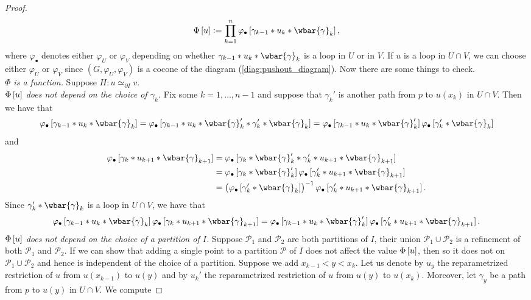 \begin{proof}
\begin{equation}
		\Phi\sbr{u} := \prod_{k = 1}^n \varphi_\bullet \sbr[0]{\gamma_{k - 1} \ast u_k \ast \wbar{\gamma}_k},
		\label{eq:Phi}
	\end{equation}
	\noindent where $\varphi_\bullet$ denotes either $\varphi_U$ or $\varphi_V$ depending on whether $\gamma_{k - 1} \ast u_k \ast \wbar{\gamma}_k$ is a loop in $U$ or in $V$. If $u$ is a loop in $U \cap V$, we can choose either $\varphi_U$ or $\varphi_V$ since $(G,\varphi_U,\varphi_V)$ is a cocone of the diagram (\ref{diag:pushout_diagram}). Now there are some things to check.\\
	\textit{$\Phi$ is a function.} Suppose $H : u \simeq_{\partial I} v$.\\
	\textit{$\Phi\sbr{u}$ does not depend on the choice of $\gamma_k$.} Fix some $k = 1,\dots,n-1$ and suppose that $\gamma_k'$ is another path from $p$ to $u(x_k)$ in $U \cap V$. Then we have that
	\begin{equation*}
		\varphi_\bullet\sbr[0]{\gamma_{k-1} \ast u_k \ast \wbar{\gamma}_k} = \varphi_\bullet\sbr[0]{\gamma_{k-1} \ast u_k \ast \wbar{\gamma}_k' \ast \gamma_k' \ast \wbar{\gamma}_k} = \varphi_\bullet\sbr[0]{\gamma_{k-1} \ast u_k \ast \wbar{\gamma}_k'} \varphi_\bullet\sbr[0]{\gamma_k' \ast \wbar{\gamma}_k} 
	\end{equation*}
	\noindent and
	\begin{align*}
		\varphi_\bullet\sbr[0]{\gamma_k \ast u_{k + 1} \ast \wbar{\gamma}_{k + 1}} &= \varphi_\bullet\sbr[0]{\gamma_k \ast \wbar{\gamma}_k' \ast \gamma_k' \ast u_{k + 1} \ast \wbar{\gamma}_{k + 1}}\\
		&= \varphi_\bullet\sbr[0]{\gamma_k \ast \wbar{\gamma}_k'}\varphi_\bullet\sbr[0]{\gamma_k' \ast u_{k + 1} \ast \wbar{\gamma}_{k + 1}}\\
		&=\del[1]{\varphi_\bullet\sbr[0]{\gamma_k' \ast \wbar{\gamma}_k}}^{-1}\varphi_\bullet\sbr[0]{\gamma_k' \ast u_{k + 1} \ast \wbar{\gamma}_{k + 1}}.
	\end{align*}
	Since $\gamma_k' \ast \wbar{\gamma}_k$ is a loop in $U \cap V$, we have that 
	\begin{equation*}
		\varphi_\bullet\sbr[0]{\gamma_{k-1} \ast u_k \ast \wbar{\gamma}_k}\varphi_\bullet\sbr[0]{\gamma_k \ast u_{k + 1} \ast \wbar{\gamma}_{k + 1}} = \varphi_\bullet\sbr[0]{\gamma_{k-1} \ast u_k \ast \wbar{\gamma}_k'}\varphi_\bullet\sbr[0]{\gamma_k' \ast u_{k + 1} \ast \wbar{\gamma}_{k + 1}}.
	\end{equation*}
	\textit{$\Phi\sbr{u}$ does not depend on the choice of a partition of $I$.} Suppose $\mathcal{P}_1$ and $\mathcal{P}_2$ are both partitions of $I$, their union $\mathcal{P}_1 \cup \mathcal{P}_2$ is a refinement of both $\mathcal{P}_1$ and $\mathcal{P}_2$. If we can show that adding a single point to a partition $\mathcal{P}$ of $I$ does not affect the value $\Phi\sbr{u}$, then so it does not on $\mathcal{P}_1 \cup \mathcal{P}_2$ and hence is independent of the choice of a partition. Suppose we add $x_{k - 1} < y < x_k$. Let us denote by $u_y$ the reparametrized restriction of $u$ from $u(x_{k - 1})$ to $u(y)$ and by $u_k'$ the reparametrized restriction of $u$ from $u(y)$ to $u(x_k)$. Moreover, let $\gamma_y$ be a path from $p$ to $u(y)$ in $U \cap V$. We compute

\end{proof}
